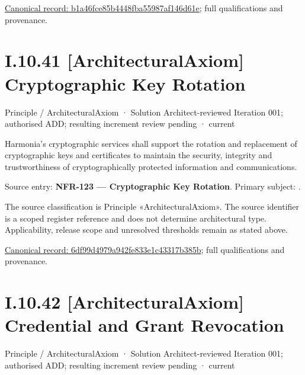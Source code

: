 {\footnotesize \href{../../../../../../../../continuum/motivation/principle/b1a46fce85b4448fba55987af146d61e.md}{Canonical record: b1a46fce85b4448fba55987af146d61e}; full qualifications and provenance.}\par
\section*{I.10.41 [ArchitecturalAxiom] Cryptographic Key Rotation}
\label{navigation:I.10.41}

\label{element:6df99d4979a942fe833e1c43317b385b}
{\small Principle / ArchitecturalAxiom · Solution Architect-reviewed Iteration 001; authorised ADD; resulting increment review pending · current}\par

Harmonia's cryptographic services shall support the rotation and replacement of cryptographic keys and certificates to maintain the security, integrity and trustworthiness of cryptographically protected information and communications.



Source entry: \textbf{NFR-123 — Cryptographic Key Rotation}. Primary subject: \texttt{}.



The source classification is Principle «ArchitecturalAxiom». The source identifier is a scoped register reference and does not determine architectural type. Applicability, release scope and unresolved thresholds remain as stated above.


{\footnotesize \href{../../../../../../../../continuum/motivation/principle/architectural-axiom/6df99d4979a942fe833e1c43317b385b.md}{Canonical record: 6df99d4979a942fe833e1c43317b385b}; full qualifications and provenance.}\par
\section*{I.10.42 [ArchitecturalAxiom] Credential and Grant Revocation}
\label{navigation:I.10.42}

\label{element:370d9a6e0e00402aba9720580a2e365e}
{\small Principle / ArchitecturalAxiom · Solution Architect-reviewed Iteration 001; authorised ADD; resulting increment review pending · current}\par

